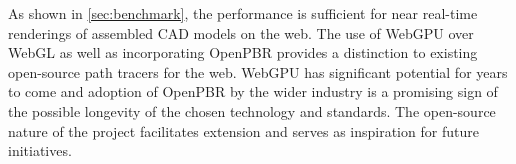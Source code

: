 As shown in \autoref{sec:benchmark}, the performance is sufficient for near real-time renderings of assembled \gls{CAD} models on the web. The use of \gls{WebGPU} over \gls{WebGL} as well as incorporating \gls{OpenPBR} provides a distinction to existing open-source path tracers for the web. \gls{WebGPU} has significant potential for years to come and adoption of \gls{OpenPBR} by the wider industry is a promising sign of the possible longevity of the chosen technology and standards. The open-source nature of the project facilitates extension and serves as inspiration for future initiatives.
